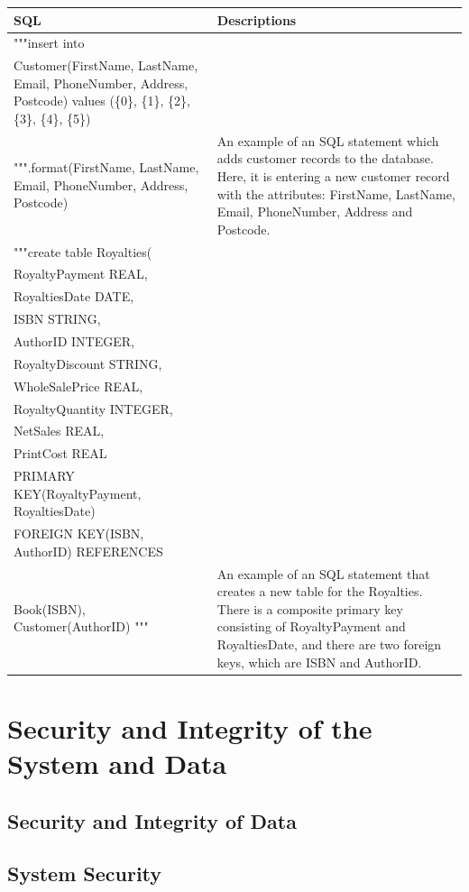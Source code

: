 \begin{tabular}{|p{10cm}|p{5cm}|}
    \hline
    \textbf{SQL} & \textbf{Descriptions} \\ \hline
     """insert into \\ Customer(FirstName, LastName, Email, PhoneNumber, Address, Postcode) values (\{0\}, \{1\}, \{2\}, \{3\}, \{4\}, \{5\}) \\ """.format(FirstName, LastName, Email, PhoneNumber, Address, Postcode) & An example of an SQL statement which adds customer records to the database. Here, it is entering a new customer record with the attributes: FirstName, LastName, Email, PhoneNumber, Address and Postcode. \\ \hline
    """create table Royalties(\\ RoyaltyPayment REAL,\\ RoyaltiesDate DATE,\\ ISBN STRING,\\ AuthorID INTEGER,\\ RoyaltyDiscount STRING,\\ WholeSalePrice REAL,\\ RoyaltyQuantity INTEGER,\\ NetSales REAL,\\ PrintCost REAL\\ PRIMARY KEY(RoyaltyPayment, RoyaltiesDate) \\ FOREIGN KEY(ISBN, AuthorID) REFERENCES \\ Book(ISBN), Customer(AuthorID) """ & An example of an SQL statement that creates a new table for the Royalties. There is a composite primary key consisting of RoyaltyPayment and RoyaltiesDate, and there are two foreign keys, which are ISBN and AuthorID. \\ \hline
\end{tabular}

\section{Security and Integrity of the System and Data}

\subsection{Security and Integrity of Data}

\subsection{System Security}

